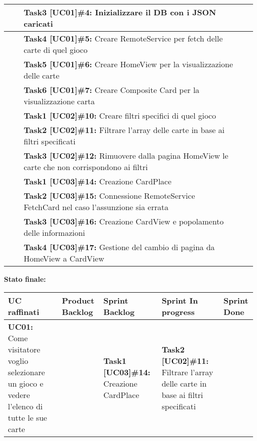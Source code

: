 \documentclass{article}
\begin{document}
\begin{itemize}
\begin{tabular}{ | p{3.5cm} | p{1.5cm} | p{5cm} | p{1.6cm} | p{1.6cm} | }
            & & \textbf{Task3 [UC01]\#4:} Inizializzare il DB con i JSON caricati & & \\
            \hline
            & & \textbf{Task4 [UC01]\#5:} Creare RemoteService per fetch delle carte di quel gioco & & \\
            \hline
            & & \textbf{Task5 [UC01]\#6:} Creare HomeView per la visualizzazione delle carte & & \\
            \hline
            & & \textbf{Task6 [UC01]\#7:} Creare Composite Card per la visualizzazione carta & & \\
            \hline
            & & \textbf{Task1 [UC02]\#10:} Creare filtri specifici di quel gioco & & \\
            \hline
            & & \textbf{Task2 [UC02]\#11:} Filtrare l'array delle carte in base ai filtri specificati & & \\
            \hline
            & & \textbf{Task3 [UC02]\#12:} Rimuovere dalla pagina HomeView le carte che non corrispondono ai filtri & & \\
            \hline
            & & \textbf{Task1 [UC03]\#14:} Creazione CardPlace & & \\
            \hline
            & & \textbf{Task2 [UC03]\#15:} Connessione RemoteService FetchCard nel caso l'assunzione sia errata & & \\
            \hline
            & & \textbf{Task3 [UC03]\#16:} Creazione CardView e popolamento delle informazioni & & \\
            \hline
            & & \textbf{Task4 [UC03]\#17:} Gestione del cambio di pagina da HomeView a CardView & & \\
            \hline
        \end{tabular}
        \newpage
        \textbf{Stato finale:}
        \newline
        \newline
        \begin{tabular}{ | p{2.4cm} | p{1.4cm} | p{2.7cm} | p{3.4cm} | p{3cm} | }
            \hline
            \textbf{UC raffinati}
            & \textbf{Product Backlog}
            & \textbf{Sprint Backlog}
            & \textbf{Sprint In progress}
            & \textbf{Sprint Done} \\
            \hline
            \textbf{UC01:} Come visitatore voglio selezionare un gioco e vedere l'elenco di tutte le sue carte
            & & \textbf{Task1 [UC03]\#14:} Creazione CardPlace
            & \textbf{Task2 [UC02]\#11:} Filtrare l'array delle carte in base ai filtri specificati

\end{tabular}
\end{itemize}
\end{document}
